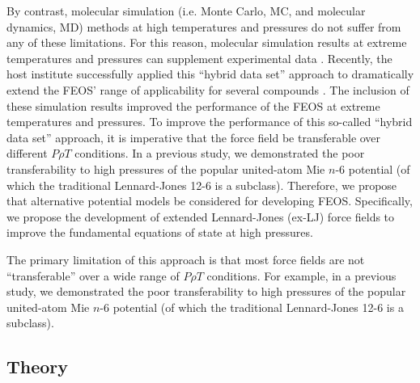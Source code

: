 \documentclass[11pt,a4paper]{article}
\begin{document}
By contrast, molecular simulation (i.e. Monte Carlo, MC, and molecular dynamics, MD) methods at high temperatures and pressures do not suffer from any of these limitations. For this reason, molecular simulation results at extreme temperatures and pressures can supplement experimental data \cite{Thol2016_LJ,Thol_LJTS,Rutkai2017,Lustig2015,Rutkai2015}. Recently, the host institute successfully applied this ``hybrid data set'' approach to dramatically extend the FEOS' range of applicability for several compounds \cite{Rutkai2013,Thol2016_siloxane_first,Thol2016_siloxane,Thol2017,Thol2015}. The inclusion of these simulation results improved the performance of the FEOS at extreme temperatures and pressures. To improve the performance of this so-called ``hybrid data set'' approach, it is imperative that the force field be transferable over different $P \rho T$ conditions. In a previous study, we demonstrated the poor transferability to high pressures of the popular united-atom Mie $n$-6 potential (of which the traditional Lennard-Jones 12-6 is a subclass). Therefore, we propose that alternative potential models be considered for developing FEOS. Specifically, we propose the development of extended Lennard-Jones (ex-LJ) force fields to improve the fundamental equations of state at high pressures.

The primary limitation of this approach is that most force fields are not ``transferable'' over a wide range of $P \rho T$ conditions. For example, in a previous study, we demonstrated the poor transferability to high pressures of the popular united-atom Mie $n$-6 potential (of which the traditional Lennard-Jones 12-6 is a subclass).    

\subsection{Theory}

\end{document}
